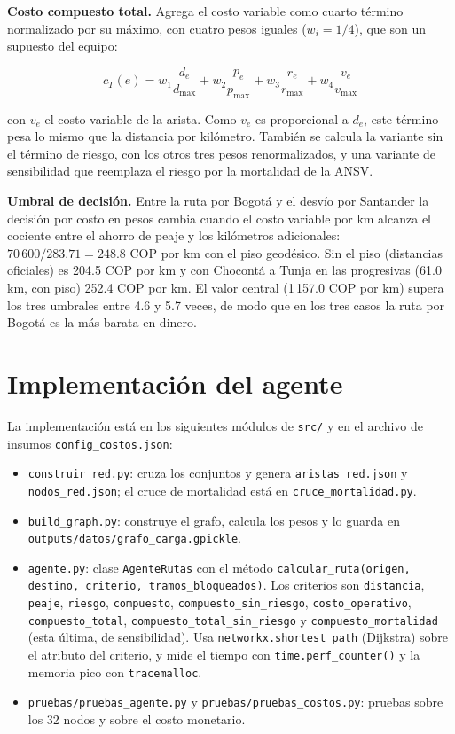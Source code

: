 \documentclass[12pt,a4paper]{article}
\begin{document}
\textbf{Costo compuesto total.} Agrega el costo variable como cuarto término
normalizado por su máximo, con cuatro pesos iguales ($w_i=1/4$), que son un
supuesto del equipo:

\begin{equation}
c_T(e) = w_1 \frac{d_e}{d_{\max}} + w_2 \frac{p_e}{p_{\max}}
       + w_3 \frac{r_e}{r_{\max}} + w_4 \frac{v_e}{v_{\max}}
\end{equation}

con $v_e$ el costo variable de la arista. Como $v_e$ es proporcional a $d_e$,
este término pesa lo mismo que la distancia por kilómetro. También se calcula
la variante sin el término de riesgo, con los otros tres pesos renormalizados,
y una variante de sensibilidad que reemplaza el riesgo por la mortalidad de la
ANSV.

\textbf{Umbral de decisión.} Entre la ruta por Bogotá y el desvío por
Santander la decisión por costo en pesos cambia cuando el costo variable por
km alcanza el cociente entre el ahorro de peaje y los kilómetros adicionales:
$70\,600 / 283.71 = 248.8$ COP por km con el piso geodésico. Sin el
piso (distancias oficiales) es 204.5 COP por km y con Chocontá a Tunja en las
progresivas (61.0 km, con piso) 252.4 COP por km. El valor central
(1\,157.0 COP por km) supera los tres umbrales entre 4.6 y 5.7 veces,
de modo que en los tres casos la ruta por Bogotá es la más barata en dinero.

\section{Implementación del agente}

La implementación está en los siguientes módulos de \texttt{src/} y en el
archivo de insumos \texttt{config\_costos.json}:

\begin{itemize}\raggedright
\item \texttt{construir\_red.py}: cruza los conjuntos y genera
\texttt{aristas\_red.json} y \texttt{nodos\_red.json}; el cruce de mortalidad
está en \texttt{cruce\_mortalidad.py}.
\item \texttt{build\_graph.py}: construye el grafo, calcula los pesos y lo
guarda en \texttt{outputs/datos/grafo\_carga.gpickle}.
\item \texttt{agente.py}: clase \texttt{AgenteRutas} con el método
\texttt{calcular\_ruta(origen, destino, criterio, tramos\_bloqueados)}. Los
criterios son \texttt{distancia}, \texttt{peaje}, \texttt{riesgo},
\texttt{compuesto}, \texttt{compuesto\_sin\_riesgo},
\texttt{costo\_operativo}, \texttt{compuesto\_total},
\texttt{compuesto\_total\_sin\_riesgo} y \texttt{compuesto\_mortalidad} (esta
última, de sensibilidad). Usa
\texttt{networkx.shortest\_path} (Dijkstra) sobre el atributo del criterio,
y mide el tiempo con \texttt{time.perf\_counter()} y la memoria pico con
\texttt{tracemalloc}.
\item \texttt{pruebas/pruebas\_agente.py} y \texttt{pruebas/pruebas\_costos.py}: pruebas sobre
los 32 nodos y sobre el costo monetario.
\end{itemize}
\end{document}
